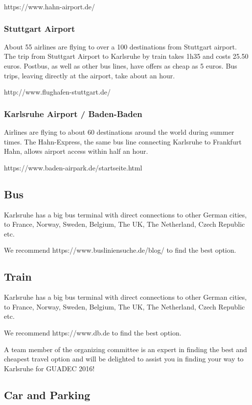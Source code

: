 https://www.hahn-airport.de/

\subsubsection{Stuttgart Airport}

About 55 airlines are flying to over a 100 destinations from Stuttgart airport. The trip from Stuttgart Airport to Karlsruhe by train takes 1h35 and costs 25.50 euros. Postbus, as well as other bus lines, have offers as cheap as 5 euros. Bus trips, leaving directly at the airport, take about an hour. 

http://www.flughafen-stuttgart.de/

\subsubsection{Karlsruhe Airport / Baden-Baden}

Airlines are flying to about 60 destinations around the world during summer times. The Hahn-Express, the same bus line connecting Karlsruhe to Frankfurt Hahn, allows airport access within half an hour.
 
https://www.baden-airpark.de/startseite.html

\subsection{Bus}

Karlsruhe has a big bus terminal with direct connections to other German cities, to France, Norway, Sweden, Belgium, The UK, The Netherland, Czech Republic etc.

We recommend https://www.busliniensuche.de/blog/ to find the best option.

\subsection{Train}

Karlsruhe has a big bus terminal with direct connections to other German cities, to France, Norway, Sweden, Belgium, The UK, The Netherland, Czech Republic etc.

We recommend https://www.db.de to find the best option.

A team member of the organizing committee is an expert in finding the best and cheapest travel option and will be delighted to assist you in finding your way to Karlsruhe for GUADEC 2016!

\subsection{Car and Parking}

